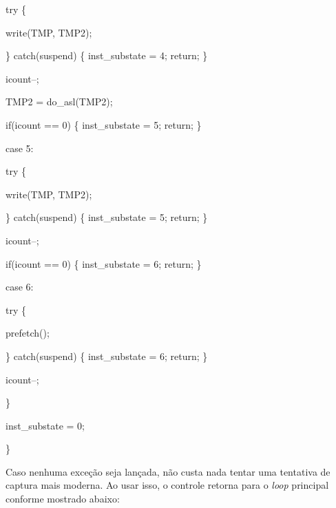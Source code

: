 \documentclass[letterpaper,10pt,brazil]{sphinxmanual}
\begin{document}
\begin{DUlineblock}{0em}
\begin{DUlineblock}{\DUlineblockindent}
\item[] try \{
\item[] write(TMP, TMP2);
\item[] \} catch(suspend) \{ inst\_substate = 4; return; \}
\item[] icount--;
\item[] TMP2 = do\_asl(TMP2);
\item[] if(icount == 0) \{ inst\_substate = 5; return; \}
\end{DUlineblock}
\item[] case 5:
\item[]
\begin{DUlineblock}{\DUlineblockindent}
\item[] try \{
\item[] write(TMP, TMP2);
\item[] \} catch(suspend) \{ inst\_substate = 5; return; \}
\item[] icount--;
\item[] if(icount == 0) \{ inst\_substate = 6; return; \}
\end{DUlineblock}
\item[] case 6:
\item[]
\begin{DUlineblock}{\DUlineblockindent}
\item[] try \{
\item[] prefetch();
\item[] \} catch(suspend) \{ inst\_substate = 6; return; \}
\item[] icount--;
\end{DUlineblock}
\item[] \}
\item[]
\begin{DUlineblock}{\DUlineblockindent}
\item[] inst\_substate = 0;
\end{DUlineblock}
\item[] \}
\end{DUlineblock}

Caso nenhuma exceção seja lançada, não custa nada tentar uma tentativa
de captura mais moderna. Ao usar isso, o controle retorna para o \emph{loop}
principal conforme mostrado abaixo:
\end{document}
